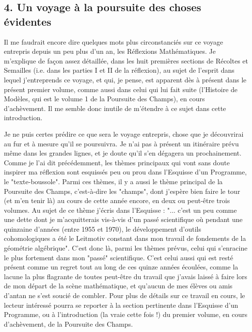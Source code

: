 \subsection{4. Un voyage à la poursuite des choses évidentes}

Il me faudrait encore dire quelques mots plus circonstanciés sur ce voyage entrepris depuis un peu plus d'un an, les Réflexions Mathématiques. Je m'explique de façon assez détaillée, dans les huit premières sections de Récoltes et Semailles (i.e. dans les parties I et II de la réflexion), au sujet de l'esprit dans lequel j'entreprends ce voyage, et qui, je pense, est apparent dès à présent dans le présent premier volume, comme aussi dans celui qui lui fait suite (l'Histoire de Modèles, qui est le volume 1 de la Poursuite des Champs), en cours d'achèvement. Il me semble donc inutile de m'étendre à ce sujet dans cette introduction.

Je ne puis certes prédire ce que sera le voyage entrepris, chose que je découvrirai au fur et à mesure qu'il se poursuivra. Je n'ai pas à présent un itinéraire prévu même dans les grandes lignes, et je doute qu'il s'en dégagera un prochainement. Comme je l'ai dit précédemment, les thèmes principaux qui vont sans doute inspirer ma réflexion sont esquissés peu ou prou dans l'Esquisse d'un Programme, le "texte-boussole". Parmi ces thèmes, il y a aussi le thème principal de la Poursuite des Champs, c'est-à-dire les "champs", dont j'espère bien faire le tour (et m'en tenir là) au cours de cette année encore, en deux ou peut-être trois volumes. Au sujet de ce thème j'écris dans l'Esquisse : "... c'est un peu comme une dette dont je m'acquitterais vis-à-vis d'un passé scientifique où pendant une quinzaine d'années (entre 1955 et 1970), le développement d'outils cohomologiques a été le Leitmotiv constant dans mon travail de fondements de la géométrie algébrique". C'est donc là, parmi les thèmes prévus, celui qui s'enracine le plus fortement dans mon "passé" scientifique. C'est celui aussi qui est resté présent comme un regret tout au long de ces quinze années écoulées, comme la lacune la plus flagrante de toutes peut-être du travail que j'avais laissé à faire lors de mon départ de la scène mathématique, et qu'aucun de mes élèves ou amis d'antan ne s'est soucié de combler. Pour plus de détails sur ce travail en cours, le lecteur intéressé pourra se reporter à la section pertinente dans l'Esquisse d'un Programme, ou à l'introduction (la vraie cette fois !) du premier volume, en cours d'achèvement, de la Poursuite des Champs.

